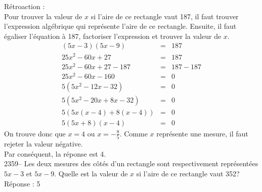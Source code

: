 \documentclass[letterpaper, 12pt]{article}
\begin{document}
R\'etroaction :\\
Pour trouver la valeur de $x$ si l'aire de ce rectangle vaut 187, il faut trouver l'expression alg\'ebrique qui repr\'esente l'aire de ce rectangle. Ensuite, il faut \'egaliser l'\'equation \`a 187, factoriser l'expression et trouver la valeur de $x$.
\begin{eqnarray*}
 (5x-3)(5x-9)&=&187\\
 25x^{2}-60x+27&=&187\\
 25x^{2}-60x+27-187&=&187-187\\
 25x^{2}-60x-160&=&0\\
 5(5x^{2}-12x-32)&=&0\\
 5(5x^{2}-20x+8x-32)&=&0\\
 5(5x(x-4)+8(x-4))&=&0\\
 5(5x+8)(x-4)&=&0
\end{eqnarray*}
On trouve donc que $x=4$ ou $x=-\frac{8}{5}$. Comme $x$ repr\'esente une mesure, il faut rejeter la valeur n\'egative.\\
Par cons\'equent, la r\'eponse est 4.\\

2359--  Les deux mesures des c\^ot\'es d'un rectangle sont respectivement repr\'esent\'ees $5x-3$ et $5x-9$. Quelle est la valeur de $x$ si l'aire de ce rectangle vaut 352? \\

R\'eponse : 5\\
\end{document}
